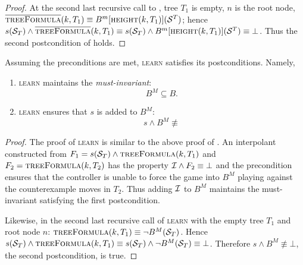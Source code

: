 \begin{proof}
At the second last recursive call to \textsc{}, tree $T_1$ is empty, $n$ is the root node, $\textsc{$\overline{\mbox{treeFormula}}$}(k, T_1) \equiv B^m[\textsc{height}(k, T_1)](\mathcal{S}^T)$; hence $s(\mathcal{S}_T) \land \textsc{$\overline{\mbox{treeFormula}}$}(k, T_1) \equiv s(\mathcal{S}_T) \land B^m[\textsc{height}(k, T_1)](\mathcal{S}^T) \equiv \bot$.  Thus the second postcondition of \textsc{} holds.

\end{proof}

\begin{proposition}\label{prop:learn}
    Assuming the preconditions are met, \textsc{learn} satisfies its postconditions. Namely,
    \begin{enumerate}
        \item \textsc{learn} maintains the \emph{must-invariant}: $$B^M \subseteq B.$$
        \item \textsc{learn} ensures that $s$ is added to $B^M$: $$s \land B^M \not\equiv$$
    \end{enumerate}
\end{proposition}

\begin{proof}
The proof of \textsc{learn} is similar to the above proof of \textsc{}. An interpolant constructed from $F_1=s(\mathcal{S}_T) \land \textsc{treeFormula}(k, T_1)$ and $F_2 = \textsc{treeFormula}(k, T_2)$ has the property $\mathcal{I} \land F_2 \equiv \bot$ and the precondition ensures that the controller is unable to force the game into $B^M$ playing against the counterexample moves in $T_2$. Thus adding $\mathcal{I}$ to $B^M$ maintains the must-invariant satisfying the first postcondition.  

Likewise, in the second last recursive call of \textsc{learn} with the empty tree $T_1$ and root node $n$: $\textsc{treeFormula}(k, T_1) \equiv \lnot B^M(\mathcal{S}_T)$.  Hence $s(\mathcal{S}_T) \land \textsc{treeFormula}(k, T_1) \equiv s(\mathcal{S}_T) \land \lnot B^M(\mathcal{S}_T) \equiv \bot$. Therefore $s \land B^M \not\equiv \bot$, the second postcondition, is true.
\end{proof}

